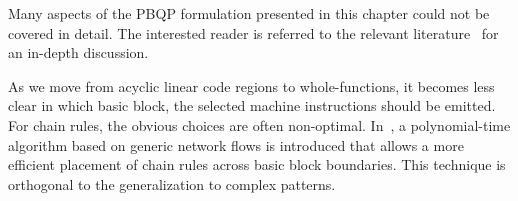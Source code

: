 Many aspects of the PBQP formulation presented in this chapter could
not be covered in detail. The interested reader is referred to the
relevant literature~\cite{EcksteinKS03,Ebner08} for an in-depth
discussion.

As we move from acyclic linear code regions to whole-functions, it
becomes less clear in which basic block, the selected machine
instructions should be emitted. For chain rules, the obvious choices
are often non-optimal. In~\cite{1269857}, a polynomial-time algorithm
based on generic network flows is introduced that allows a more
efficient placement of chain rules across basic block boundaries. This
technique is orthogonal to the generalization to complex patterns.

